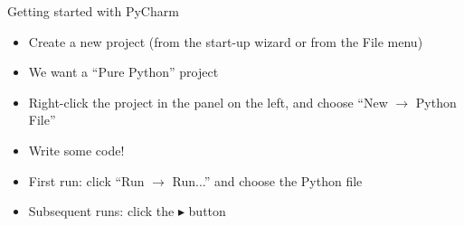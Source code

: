 \begin{frame}{Getting started with PyCharm}
\begin{itemize}
\pause\item Create a new project (from the start-up wizard or from the File menu)
\pause\item We want a ``Pure Python'' project
\pause\item Right-click the project in the panel on the left, and choose ``New $\to$ Python File''
\pause\item Write some code!
\pause\item First run: click ``Run $\to$ Run...'' and choose the Python file
\pause\item Subsequent runs: click the $\blacktriangleright$ button
\end{itemize}
\end{frame}

